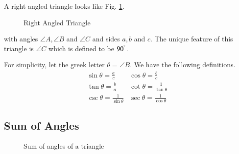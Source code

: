 
\begin{definition}


A right angled triangle looks like Fig. \ref{ch1_right}.
\begin{figure}[!h]
\begin{center}
	
\resizebox{\columnwidth}{!}{}
\end{center}
\caption{Right Angled Triangle}
\label{ch1_right}	
\end{figure}
with angles $\angle A,\angle B$ and $\angle C$ and sides $a, b$ and $c$.  The unique feature of this triangle is $\angle C$ which is defined to be $90^{\degree}$.
\end{definition}
\begin{definition}
	For simplicity, let the greek letter $\theta = \angle B$.  We have the following definitions.
\begin{equation}
\label{ch1_trig_defs}
\begin{matrix}
	\sin \theta = \frac{a}{c} & 	\cos \theta = \frac{b}{c} \\
	\tan \theta = \frac{b}{a} & \cot \theta = \frac{1}{\tan \theta} \\
	\csc \theta = \frac{1}{\sin \theta} & \sec \theta = \frac{1}{\cos \theta}
	\end{matrix}
\end{equation}
\end{definition}

\subsection{Sum of Angles}
\begin{figure}[!h]
	\begin{center}
		\resizebox{\columnwidth}{!}{}
	\end{center}
	\caption{Sum of angles of a triangle}
	\label{ch1_parallel_triangle}	
\end{figure}

